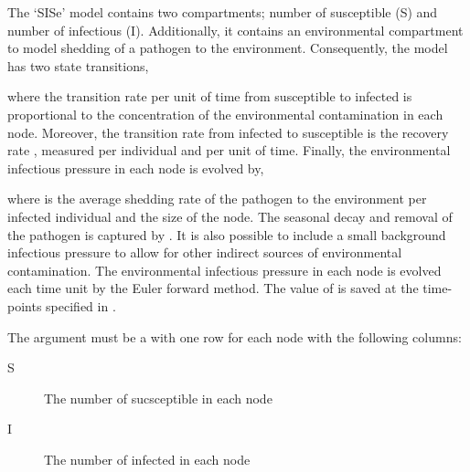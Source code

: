 \documentclass[letterpaper]{book}
\begin{document}
\begin{Details}
The `SISe' model contains two compartments; number of
susceptible (S) and number of infectious (I). Additionally, it
contains an environmental compartment to model shedding of a
pathogen to the environment. Consequently, the model has two state
transitions,



where the transition rate per unit of time from susceptible to
infected is proportional to the concentration of the environmental
contamination \eqn{\varphi}{} in each node. Moreover, the
transition rate from infected to susceptible is the recovery rate
\eqn{\gamma}{}, measured per individual and per unit of
time. Finally, the environmental infectious pressure in each node
is evolved by,


where \eqn{\alpha}{} is the average shedding rate of the pathogen to
the environment per infected individual and  the
size of the node. The seasonal decay and removal of the pathogen
is captured by . It is also possible to include a
small background infectious pressure \eqn{\epsilon}{} to allow for
other indirect sources of environmental contamination. The
environmental infectious pressure  in each
node is evolved each time unit by the Euler forward method. The
value of  is saved at the time-points
specified in .

The argument  must be a  with one row for
each node with the following columns:
\begin{description}

\item[S] The number of sucsceptible in each node
\item[I] The number of infected in each node

\end{description}

\end{Details}
%
\begin{Value}
\end{Value}
%
\end{document}
